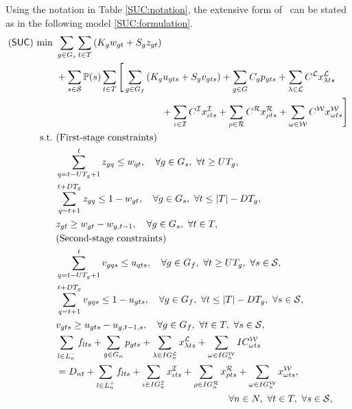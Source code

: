 Using the notation in Table \ref{SUC:notation}, the extensive form of \suc\ can be stated as in the following model \ref{SUC:formulation}.
\begin{subequations} \label{SUC:formulation}
	\begin{align}
	(\suc)\ \textrm{min}\ &\sum_{g\in G_s}\sum_{t \in T}\left(K_g w_{gt}+S_g z_{gt}\right) \nonumber \\	
	&+ \sum_{s\in\mathcal{S}}\PP(s)\sum_{t\in T} 
	\Bigg[	 \sum_{g\in G_f} \left(K_g u_{gts}+S_g v_{gts}\right) + \sum_{g\in G}C_g p_{gts} + \sum_{\lambda\in \mathcal{L}} C^{\mathcal{L}}x_{\lambda ts}^{\mathcal{L}} \nonumber \\&\qquad\qquad\qquad\qquad\qquad\quad  + \sum_{\iota\in \mathcal{I}} C^{\mathcal{I}}x_{\iota ts}^{\mathcal{I}} + \sum_{\rho\in \mathcal{R}} C^{\mathcal{R}}x_{\rho ts}^{\mathcal{R}} + \sum_{\omega\in \mathcal{W}} C^{\mathcal{W}}x_{\omega ts}^{\mathcal{W}} \Bigg]
	\label{SUC:obj}\\
	\textrm{s.t.}\ &  \textrm{(First-stage constraints)} \nonumber\\
	&\sum_{q=t-UT_g+1}^t z_{gq}\le w_{qt},\quad\forall g\in G_s,\ \forall t\ge UT_g,	\label{SUC:b}\\
	&\sum_{q=t+1}^{t+DT_g} z_{gq}\le 1-w_{gt},\quad\forall g\in G_s,\ \forall t\le |T|-DT_g,\label{SUC:c}\\
	&z_{gt}\ge w_{gt}-w_{g,t-1},\quad\forall g\in G_s,\ \forall t\in T,\label{SUC:d}\\
	&  \textrm{(Second-stage constraints)} \nonumber\\
	&  \sum_{q=t-UT_g+1}^t v_{gqs}\le u_{qts},\quad\forall g\in G_f,\ \forall t\ge UT_g,\ \forall s\in\mathcal{S},\label{SUC:e}\\
	&\sum_{q=t+1}^{t+DT_g} v_{gqs}\le 1-u_{gts},\quad\forall g\in G_f,\ \forall t\le |T|-DT_g,\ \forall s\in\mathcal{S},\label{SUC:f}\\
	&v_{gts}\ge u_{gts}-u_{g,t-1,s},\quad\forall g\in G_f,\ \forall t\in T,\ \forall s\in\mathcal{S},\label{SUC:g}\\
	&\sum_{l\in L_n^-}f_{lts}+\sum_{g\in G_n} p_{gts}+\sum_{\lambda\in IG_n^\mathcal{L}}x_{\lambda ts}^\mathcal{L} +\sum_{\omega\in IG_n^\mathcal{W}} IC_{\omega ts}^\mathcal{W} \nonumber \\ 
	&= D_{nt}+\sum_{l\in L_n^+}f_{lts}+\sum_{\iota\in IG_n^\mathcal{I}}x_{\iota ts}^\mathcal{I} + \sum_{\rho\in IG_n^\mathcal{R}} x_{\rho ts}^\mathcal{R} +\sum_{\omega\in IG_n^\mathcal{W}} x_{\omega ts}^\mathcal{W}, \nonumber \\
	&\qquad\qquad\qquad\qquad\qquad\qquad\qquad\qquad\qquad\forall n\in N,\ \forall t\in T,\ \forall s\in\mathcal{S},\label{SUC:h}\\

\end{align}
\end{subequations}
